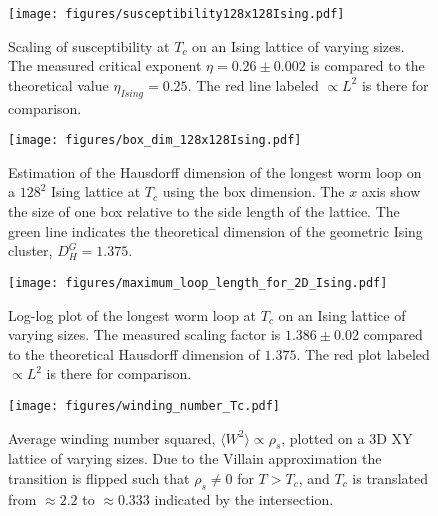 \begin{figure}[h!]
    \centering
        \texttt{[image: figures/susceptibility128x128Ising.pdf]}
    \caption{Scaling of susceptibility at $T_c$ on an Ising lattice of varying sizes. The measured critical exponent $\eta = 0.26 \pm 0.002$ is compared to the theoretical value $\eta_{Ising} = 0.25$. The red line labeled $\propto L^2$ is there for comparison.}
    \label{fig:results_isingsusc}
\end{figure}

\begin{figure}[h!]
    \centering
        \texttt{[image: figures/box\_dim\_128x128Ising.pdf]}
    \caption{Estimation of the Hausdorff dimension of the longest worm loop on a $128^2$ Ising lattice at $T_c$ using the box dimension. The $x$ axis show the size of one box relative to the side length of the lattice. The green line indicates the theoretical dimension of the geometric Ising cluster, $D_H^G = 1.375$.}
    \label{fig:results_boxdimension}
\end{figure}

\begin{figure}[h!]
    \centering
        \texttt{[image: figures/maximum\_loop\_length\_for\_2D\_Ising.pdf]}
    \caption{Log-log plot of the longest worm loop at $T_c$ on an Ising lattice of varying sizes. The measured scaling factor is $1.386 \pm 0.02$ compared to the theoretical Hausdorff dimension of $1.375$. The red plot labeled $\propto L^2$ is there for comparison.}
    \label{fig:results_maxloopdimension}
\end{figure}


\begin{figure}[h!]
    \centering
        \texttt{[image: figures/winding\_number\_Tc.pdf]}
    \caption{Average winding number squared, $\langle W^2 \rangle \propto \rho_s$, plotted on a 3D XY lattice of varying sizes. Due to the Villain approximation the transition is flipped such that $\rho_s \neq 0$ for $T > T_c$, and $T_c$ is translated from $\approx 2.2$ to $\approx 0.333$ indicated by the intersection.}
    \label{fig:results_windingnumberTc}
\end{figure}

